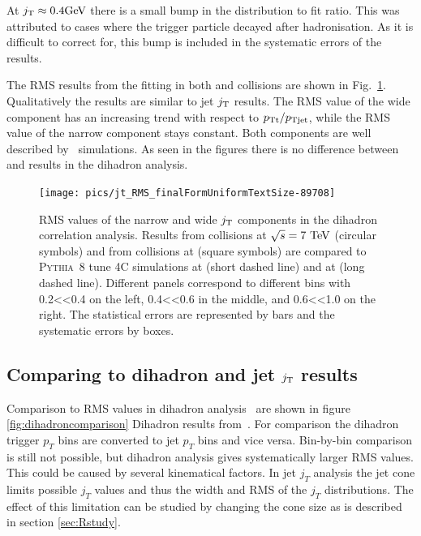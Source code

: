 At $j_{\rm T} \approx 0.4 \mathrm{GeV}\kern-0.05em$ there is a small bump in the distribution to fit ratio. This was attributed to cases where the trigger particle decayed after hadronisation. As it is difficult to correct for, this bump is included in the systematic errors of the results.  


The RMS results from the fitting in both \pp and \pPb collisions are shown in Fig.~\ref{fig:dihadronResults}. Qualitatively the results are similar to jet $j_{\rm T}$ results. The RMS value of the wide component has an increasing trend with respect to $p_{\rm Tt}/p_{\rm Tjet}$, while the RMS value of the narrow component stays constant. Both components are well described by \pythia~simulations. As seen in the figures there is no difference between \pp and \pPb results in the dihadron analysis. 



\begin{figure}[htb]
\centering
\texttt{[image: pics/jt\_RMS\_finalFormUniformTextSize-89708]}
\caption{RMS values of the narrow and wide $j_{\rm T}$ components in the dihadron correlation analysis. Results from \pp collisions at $\sqrt{s} = 7 \mbox{~TeV}$ (circular symbols) and from \pPb collisions at  (square symbols) are compared to \textsc{Pythia}~8 tune 4C simulations at  (short dashed line) and at  (long dashed line). Different panels correspond to different \xlong bins with 0.2<\xlong<0.4 on the left, 0.4<\xlong<0.6 in the middle, and 0.6<\xlong<1.0 on the right. The statistical errors are represented by bars and the systematic errors by boxes.~\cite{ALICEjt}}
\label{fig:dihadronResults}
\end{figure}


\subsection{Comparing to dihadron and jet $j_{\rm T}$ results}
Comparison to RMS values in dihadron analysis~\cite{jussi} are shown in figure \ref{fig:dihadroncomparison} Dihadron results from~\cite{jussi}. For comparison the dihadron trigger $p_T$ bins are converted to jet $p_T$ bins and vice versa. Bin-by-bin comparison is still not possible, but dihadron analysis gives systematically larger RMS values. This could be caused by several kinematical factors. In jet $j_T$ analysis the jet cone limits possible $j_T$ values and thus the width and RMS of the $j_T$ distributions. The effect of this limitation can be studied by changing the cone size as is described in section \ref{sec:Rstudy}. 

